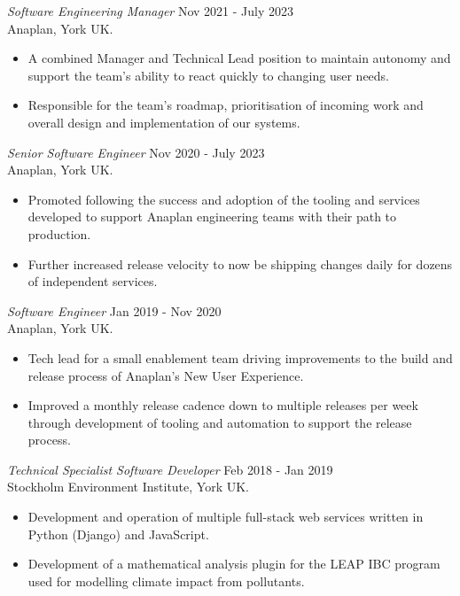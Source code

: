 \documentclass[margin]{res}
\begin{document}
\begin{resume}
{\sl Software Engineering Manager} \hfill Nov 2021 - July 2023  \\
Anaplan, York UK.
\begin{itemize}  \itemsep -2pt %
  \item A combined Manager and Technical Lead position to
        maintain autonomy and support the team's ability to react
        quickly to changing user needs.
  \item Responsible for the team's roadmap, prioritisation of incoming
        work and overall design and implementation of our systems.
\end{itemize}

{\sl Senior Software Engineer} \hfill Nov 2020 - July 2023  \\
Anaplan, York UK.
\begin{itemize}  \itemsep -2pt %
  \item Promoted following the success and adoption of the tooling and
        services developed to support Anaplan engineering teams with
        their path to production.
  \item Further increased release velocity to now be shipping changes
        daily for dozens of independent services.
\end{itemize}

{\sl Software Engineer} \hfill Jan 2019 - Nov 2020 \\
Anaplan, York UK.
\begin{itemize}  \itemsep -2pt %
  \item Tech lead for a small enablement team driving improvements to
        the build and release process of Anaplan's New User Experience.
  \item Improved a monthly release cadence down to multiple releases per
        week through development of tooling and automation to support the
        release process.
\end{itemize}

{\sl Technical Specialist Software Developer} \hfill Feb 2018 - Jan 2019 \\
Stockholm Environment Institute, York UK.
\begin{itemize}  \itemsep -2pt %
  \item Development and operation of multiple full-stack web services written
        in Python (Django) and JavaScript.
  \item Development of a mathematical analysis plugin for the LEAP IBC program
        used for modelling climate impact from pollutants.
\end{itemize}


\end{resume}
\end{document}
